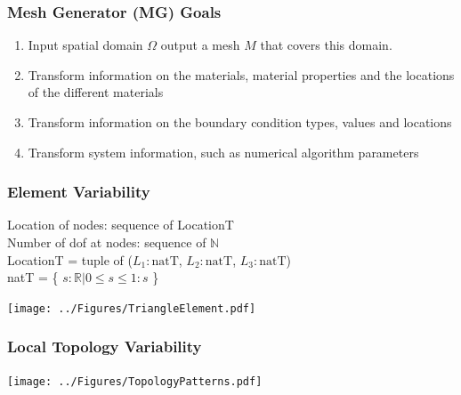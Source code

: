 \documentclass[t,12pt,numbers,fleqn]{beamer}
\begin{document}
\begin{frame}

\frametitle{Mesh Generator (MG) Goals}

\begin{enumerate}[G1]

\item Input spatial domain $\Omega$ output a mesh $M$ that covers this domain.

\item Transform information on the materials, material properties and the
locations of the different materials

\item Transform information on the boundary condition types, values and locations

\item Transform system information, such as numerical algorithm parameters

\end{enumerate}

\end{frame}


\begin{frame}

\frametitle{Element Variability}

Location of nodes: sequence of LocationT \\
Number of dof at nodes: sequence of $\mathbb{N}$ \\
LocationT = tuple of ($L_1: \mbox{natT}$, $L_2: \mbox{natT}$, $L_3: \mbox{natT}$)\\
natT = \{ $s: \mathbb{R} | 0 \leq s \leq 1 : s$ \}\\

\begin{center}
{
 \texttt{[image: ../Figures/TriangleElement.pdf]}
}
\end{center}

\end{frame}


\begin{frame}

\frametitle{Local Topology Variability}

\begin{center}
{
\texttt{[image: ../Figures/TopologyPatterns.pdf]}
}
\end{center}

\end{frame}
\end{document}

